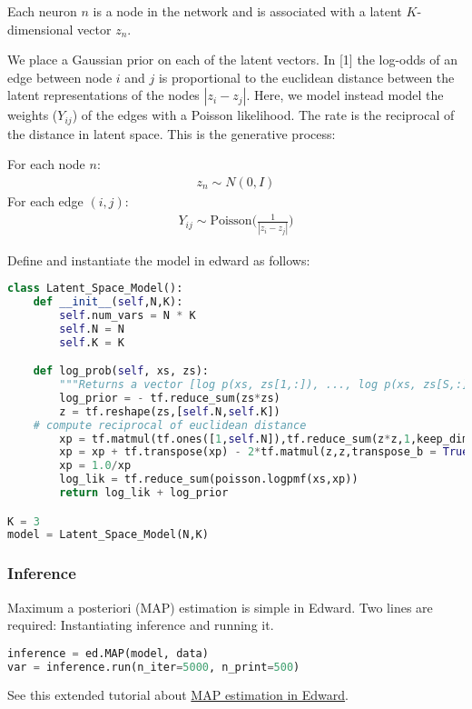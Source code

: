 Each neuron $n$ is a node in the network and is associated with a latent $K$-dimensional vector $z_n$.

We place a Gaussian prior on each of the latent vectors.
In [1] the log-odds of an edge between node $i$ and $j$ is proportional to the euclidean distance between the latent representations of the nodes $|z_i- z_j|$. Here, we model instead model the weights ($Y_{ij}$) of the edges with a Poisson likelihood. The rate is the reciprocal of the distance in latent space. This is the generative process:

For each node $n$:
\begin{align}
z_n \sim N(0,I)
\end{align}
For each edge $(i,j)$:
\begin{align}
Y_{ij} \sim \text{Poisson}\Bigg(\frac{1}{|z_i - z_j|}\Bigg)
\end{align}

Define and instantiate the model in edward as follows:
\begin{lstlisting}[language=Python]
class Latent_Space_Model():
    def __init__(self,N,K):
        self.num_vars = N * K
        self.N = N
        self.K = K

    def log_prob(self, xs, zs):
        """Returns a vector [log p(xs, zs[1,:]), ..., log p(xs, zs[S,:])]."""
        log_prior = - tf.reduce_sum(zs*zs)
        z = tf.reshape(zs,[self.N,self.K])
	# compute reciprocal of euclidean distance
        xp = tf.matmul(tf.ones([1,self.N]),tf.reduce_sum(z*z,1,keep_dims=True))
        xp = xp + tf.transpose(xp) - 2*tf.matmul(z,z,transpose_b = True)
        xp = 1.0/xp
        log_lik = tf.reduce_sum(poisson.logpmf(xs,xp))
        return log_lik + log_prior

K = 3
model = Latent_Space_Model(N,K)
\end{lstlisting}

\subsubsection{Inference}

Maximum a posteriori (MAP) estimation is simple in Edward. Two lines are
required: Instantiating inference and running it.
\begin{lstlisting}[language=Python]
inference = ed.MAP(model, data)
var = inference.run(n_iter=5000, n_print=500)
\end{lstlisting}

See this extended tutorial about
\href{tut_MAP.html}{MAP estimation in Edward}.

